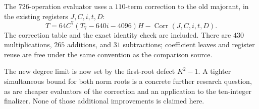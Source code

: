 The $726$-operation evaluator uses a $110$-term correction to the old
majorant, in the existing registers $J,C,i,t,D$:
\[
 T=64C^7(T_7-640i-4096)H
                   -\operatorname{Corr}(J,C,i,t,D).
\]
The correction table and the exact identity check are included. There
are $430$ multiplications, $265$ additions, and $31$ subtractions;
coefficient leaves and register reuse are free under the same convention
as the comparison source.

The new degree limit is now set by the first-root defect $K^2-1$. A tighter
simultaneous bound for both norm roots is a concrete further research
question, as are cheaper evaluators of the correction and an application
to the ten-integer finalizer. None of those additional improvements is
claimed here.
